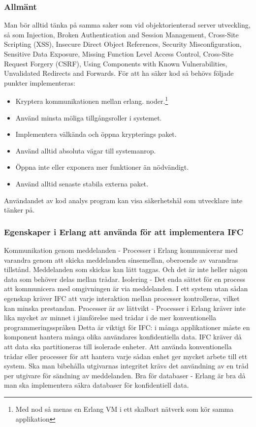\documentclass[12pt]{article}
\begin{document}
\subsubsection*{Allmänt}
	Man bör alltid tänka på samma saker som vid objektorienterad server utveckling, så som Injection, Broken Authentication and Session Management, Cross-Site Scripting (XSS), Insecure Direct Object References, Security Misconfiguration, Sensitive Data Exposure, Missing Function Level Access Control, Cross-Site Request Forgery (CSRF), Using Components with Known Vulnerabilities, Unvalidated Redirects and Forwards.
\cite{owasp}
	För att ha säker kod så behövs följade punkter implementeras:
	\begin{itemize} 
		\item Kryptera kommunikationen mellan erlang.
noder.\footnote{Med nod så menas en Erlang VM i ett skalbart nätverk som kör samma applikation}
		\item Använd minsta möliga tillgångsroller i systemet.
		\item Implementera välkända och öppna krypterings paket.
		\item Använd alltid absoluta vägar till systemanrop.
		\item Öppna inte eller exponera mer funktioner än nödvändigt.
		\item Använd alltid senaste stabila externa paket.
	\end{itemize}
Användandet av kod analys program kan visa säkerhetshål som utvecklare inte tänker på.

\subsubsection*{Egenskaper i Erlang att använda för att implementera IFC} 
Kommunikation genom meddelanden - Processer i Erlang kommunicerar med varandra genom att skicka meddelanden sinsemellan, oberoende av varandras tillstånd.
 Meddelanden som skickas kan lätt taggas.
 Och det är inte heller någon data som behöver delas mellan trådar.
Isolering - Det enda sättet för en process att kommunicera med omgivningen är via meddelanden.
 I ett system utan sådan egenskap kräver IFC att varje interaktion mellan processer kontrolleras, vilket kan minska prestandan.
 Processer är av lättvikt - Processer i Erlang kräver inte lika mycket av minnet i jämförelse med trådar i de mer konventionella programmeringsspråken Detta är viktigt för IFC: i många applikationer måste en komponent hantera många olika användares konfidentiella data.
 IFC kräver då att data ska partitioneras till isolerade enheter.
 Att använda konventionella trådar eller processer för att hantera varje sådan enhet ger mycket arbete till ett system.
 Ska man bibehålla utgivarnas integritet krävs det användning av en tråd per utgivare för sändning av meddelanden.
 \cite{IFC}
Bra för databaser - Erlang är bra då man ska implementera säkra databaser för konfidentiell data.
 \cite{database}
\end{document}
